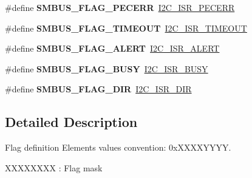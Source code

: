 \begin{DoxyCompactItemize}
\item 
\mbox{\label{group___s_m_b_u_s___flag__definition_ga20d03a26be9838faa6f543194873e3c6}} 
\#define {\bfseries S\+M\+B\+U\+S\+\_\+\+F\+L\+A\+G\+\_\+\+P\+E\+C\+E\+RR}~\hyperlink{group___peripheral___registers___bits___definition_ga8b1d42968194fb42f9cc9bb2c2806281}{I2\+C\+\_\+\+I\+S\+R\+\_\+\+P\+E\+C\+E\+RR}
\item 
\mbox{\label{group___s_m_b_u_s___flag__definition_gad660216f7833e6a152131b9665a67a2c}} 
\#define {\bfseries S\+M\+B\+U\+S\+\_\+\+F\+L\+A\+G\+\_\+\+T\+I\+M\+E\+O\+UT}~\hyperlink{group___peripheral___registers___bits___definition_ga63fc8ce165c42d0d719c45e58a82f574}{I2\+C\+\_\+\+I\+S\+R\+\_\+\+T\+I\+M\+E\+O\+UT}
\item 
\mbox{\label{group___s_m_b_u_s___flag__definition_ga9478f88c0bb4dc0fb30ea3ca642a0e14}} 
\#define {\bfseries S\+M\+B\+U\+S\+\_\+\+F\+L\+A\+G\+\_\+\+A\+L\+E\+RT}~\hyperlink{group___peripheral___registers___bits___definition_ga4c6c779bca999450c595fc797a1fdeec}{I2\+C\+\_\+\+I\+S\+R\+\_\+\+A\+L\+E\+RT}
\item 
\mbox{\label{group___s_m_b_u_s___flag__definition_ga2378691063c5e3f1f71a9075455f52a4}} 
\#define {\bfseries S\+M\+B\+U\+S\+\_\+\+F\+L\+A\+G\+\_\+\+B\+U\+SY}~\hyperlink{group___peripheral___registers___bits___definition_ga12ba21dc10ca08a2063a1c4672ffb886}{I2\+C\+\_\+\+I\+S\+R\+\_\+\+B\+U\+SY}
\item 
\mbox{\label{group___s_m_b_u_s___flag__definition_ga17791d68c7839af0ca78616c6081ee6d}} 
\#define {\bfseries S\+M\+B\+U\+S\+\_\+\+F\+L\+A\+G\+\_\+\+D\+IR}~\hyperlink{group___peripheral___registers___bits___definition_gaa4890d7deb94106f946b28a7309e22aa}{I2\+C\+\_\+\+I\+S\+R\+\_\+\+D\+IR}
\end{DoxyCompactItemize}


\subsection{Detailed Description}
Flag definition Elements values convention\+: 0x\+X\+X\+X\+X\+Y\+Y\+YY. 


\begin{DoxyItemize}
\item X\+X\+X\+X\+X\+X\+XX \+: Flag mask 
\end{DoxyItemize}